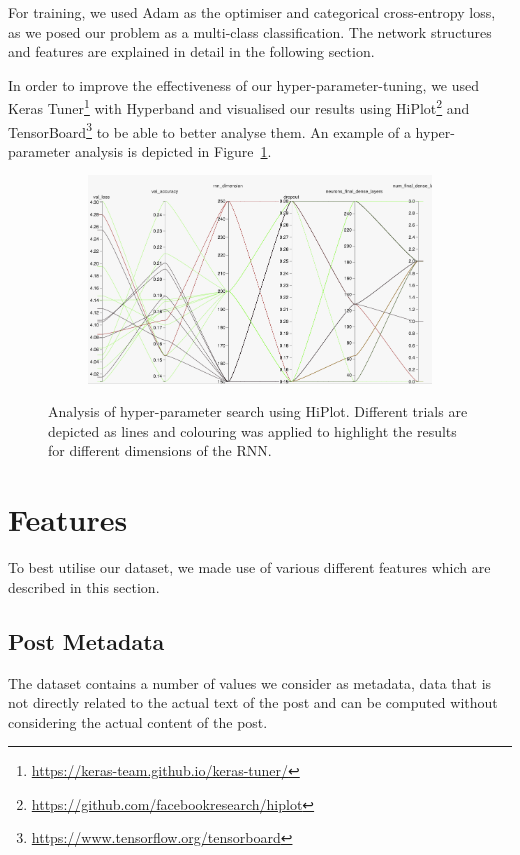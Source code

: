 \documentclass[acmsmall]{acmart}
\begin{document}
For training, we used Adam \cite{adam} as the optimiser and categorical cross-entropy loss, as we posed our problem as a multi-class classification. The network structures and features are explained in detail in the following section. 

In order to improve the effectiveness of our hyper-parameter-tuning, we used Keras Tuner\footnote{\url{https://keras-team.github.io/keras-tuner/}} with Hyperband \cite{hyperband} and visualised our results using HiPlot\footnote{\url{https://github.com/facebookresearch/hiplot}} and TensorBoard\footnote{\url{https://www.tensorflow.org/tensorboard}} to be able to better analyse them. An example of a hyper-parameter analysis is depicted in Figure~\ref{fig:hiplot}.

\begin{figure}
\centering
\begin{subfigure}{.9\textwidth}
\centering
  \includegraphics[width=.9\linewidth]{assets/hiplot.png}
 \end{subfigure}%
\caption{Analysis of hyper-parameter search using HiPlot. Different trials are depicted as lines and colouring was applied to highlight the results for different dimensions of the RNN.}
\label{fig:hiplot}
\end{figure}

\section{Features}
To best utilise our dataset, we made use of various different features which are described in this section. 

\subsection{Post Metadata}
The dataset contains a number of values we consider as metadata, data that is not directly related to the actual text of the post and can be computed without considering the actual content of the post. 
\end{document}
